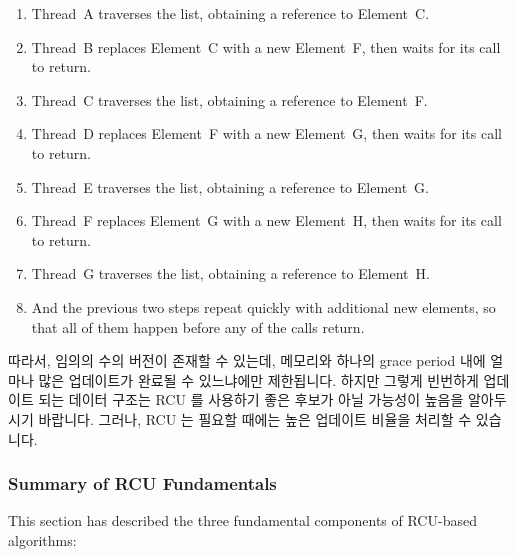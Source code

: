 {{\begin{enumerate}
	\item	Thread~A traverses the list, obtaining a reference to
		Element~C.
	\item	Thread~B replaces Element~C with a new
		Element~F, then waits for its 
		call to return.
	\item	Thread~C traverses the list, obtaining a reference to
		Element~F.
	\item	Thread~D replaces Element~F with a new
		Element~G, then waits for its 
		call to return.
	\item	Thread~E traverses the list, obtaining a reference to
		Element~G.
	\item	Thread~F replaces Element~G with a new
		Element~H, then waits for its 
		call to return.
	\item	Thread~G traverses the list, obtaining a reference to
		Element~H.
	\item	And the previous two steps repeat quickly with additional
		new elements, so that all of them happen before any of
		the  calls return.

	\fi

	\end{enumerate}

	따라서, 임의의 수의 버전이 존재할 수 있는데, 메모리와 하나의 grace
	period 내에 얼마나 많은 업데이트가 완료될 수 있느냐에만 제한됩니다.
	하지만 그렇게 빈번하게 업데이트 되는 데이터 구조는 RCU 를 사용하기 좋은
	후보가 아닐 가능성이 높음을 알아두시기 바랍니다.
	그러나, RCU 는 필요할 때에는 높은 업데이트 비율을 처리할 수 있습니다.

}\QuickQuizEndE
}

\subsubsection{Summary of RCU Fundamentals}
\label{sec:defer:Summary of RCU Fundamentals}

This section has described the three fundamental components of RCU-based
algorithms:

